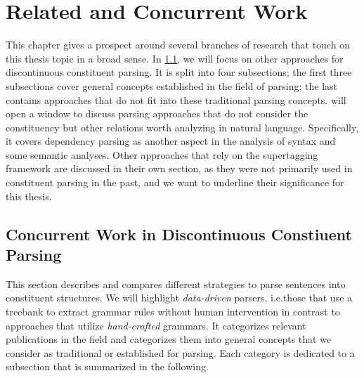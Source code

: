 \documentclass[../document.tex]{subfiles}
\begin{document}
    \chapter{Related and Concurrent Work}\label{sec:literature}
    This chapter gives a prospect around several branches of research that touch on this thesis topic in a broad sense.
    In \cref{sec:literature:constituency}, we will focus on other approaches for discontinuous constituent parsing.
    It is split into four subsections; the first three subsections cover general concepts established in the field of parsing; the last contains approaches that do not fit into these traditional parsing concepts.
     will open a window to discuss parsing approaches that do not consider the constituency but other relations worth analyzing in natural language.
    Specifically, it covers dependency parsing as another aspect in the analysis of syntax and some semantic analyses.
    Other approaches that rely on the supertagging framework are discussed in their own section, as they were not primarily used in constituent parsing in the past, and we want to underline their significance for this thesis.

    \section{Concurrent Work in Discontinuous Constiuent Parsing}\label{sec:literature:constituency}
    This section describes and compares different strategies to parse sentences into constituent structures.
    We will highlight \emph{data-driven} parsers, i.e.\@ those that use a treebank to extract grammar rules without human intervention \citep[cf.\@][Section~1.1]{Kal10} in contrast to approaches that utilize \emph{hand-crafted} grammars.
    It categorizes relevant publications in the field and categorizes them into general concepts that we consider as traditional or established for parsing.
    Each category is dedicated to a subsection that is summarized in the following.
\end{document}
